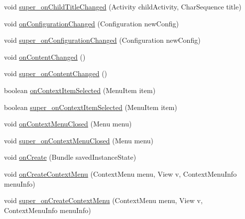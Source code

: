 \begin{DoxyCompactItemize}
\item 
void \hyperlink{classorg_1_1qtproject_1_1qt5_1_1android_1_1bindings_1_1_qt_activity_ac369eb38a2ea1f7a0d61c44a30d63620}{super\+\_\+on\+Child\+Title\+Changed} (Activity child\+Activity, Char\+Sequence title)
\item 
void \hyperlink{classorg_1_1qtproject_1_1qt5_1_1android_1_1bindings_1_1_qt_activity_a75ef70261caa7d4db3041147dc46c5d0}{on\+Configuration\+Changed} (Configuration new\+Config)
\item 
void \hyperlink{classorg_1_1qtproject_1_1qt5_1_1android_1_1bindings_1_1_qt_activity_a1c7f2e1b1ce16f2bfa70f38d88740565}{super\+\_\+on\+Configuration\+Changed} (Configuration new\+Config)
\item 
void \hyperlink{classorg_1_1qtproject_1_1qt5_1_1android_1_1bindings_1_1_qt_activity_a6310ffd404267a66b52dd4c3b357b560}{on\+Content\+Changed} ()
\item 
void \hyperlink{classorg_1_1qtproject_1_1qt5_1_1android_1_1bindings_1_1_qt_activity_a65dc57b70d42eb56f6bc12f7e0c49022}{super\+\_\+on\+Content\+Changed} ()
\item 
boolean \hyperlink{classorg_1_1qtproject_1_1qt5_1_1android_1_1bindings_1_1_qt_activity_a67108692da62e48e5d02b22ed3d83769}{on\+Context\+Item\+Selected} (Menu\+Item item)
\item 
boolean \hyperlink{classorg_1_1qtproject_1_1qt5_1_1android_1_1bindings_1_1_qt_activity_a7281a498436213e739110753b357c0bd}{super\+\_\+on\+Context\+Item\+Selected} (Menu\+Item item)
\item 
void \hyperlink{classorg_1_1qtproject_1_1qt5_1_1android_1_1bindings_1_1_qt_activity_a3e845800dc8fc21ff23589005d1a781c}{on\+Context\+Menu\+Closed} (Menu menu)
\item 
void \hyperlink{classorg_1_1qtproject_1_1qt5_1_1android_1_1bindings_1_1_qt_activity_a1b845060cb1ae8dde9bb8a60339b9468}{super\+\_\+on\+Context\+Menu\+Closed} (Menu menu)
\item 
void \hyperlink{classorg_1_1qtproject_1_1qt5_1_1android_1_1bindings_1_1_qt_activity_aa826639406d6f0697e0f1afcf69c748c}{on\+Create} (Bundle saved\+Instance\+State)
\item 
void \hyperlink{classorg_1_1qtproject_1_1qt5_1_1android_1_1bindings_1_1_qt_activity_a924489f96650a755cf63980f3d388e8e}{on\+Create\+Context\+Menu} (Context\+Menu menu, View v, Context\+Menu\+Info menu\+Info)
\item 
void \hyperlink{classorg_1_1qtproject_1_1qt5_1_1android_1_1bindings_1_1_qt_activity_ae235bff28fac3ae862e49a1fc52caf15}{super\+\_\+on\+Create\+Context\+Menu} (Context\+Menu menu, View v, Context\+Menu\+Info menu\+Info)

\end{DoxyCompactItemize}
